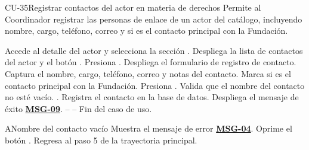 \begin{UseCase}{CU-35}{Registrar contactos del actor en materia de derechos}{
	Permite al Coordinador registrar las personas de enlace de un actor del catálogo, incluyendo nombre, cargo, teléfono, correo y si es el contacto principal con la Fundación.
}
\end{UseCase}

\begin{UCtrayectoria}
	\UCpaso[\UCactor] Accede al detalle del actor y selecciona la sección .
	\UCpaso Despliega la lista de contactos del actor y el botón .
	\UCpaso[\UCactor] Presiona .
	\UCpaso Despliega el formulario de registro de contacto.
	\UCpaso[\UCactor] Captura el nombre, cargo, teléfono, correo y notas del contacto.
	\UCpaso[\UCactor] Marca si es el contacto principal con la Fundación.
	\UCpaso[\UCactor] Presiona .
	\UCpaso Valida que el nombre del contacto no esté vacío. .
	\UCpaso Registra el contacto en la base de datos.
	\UCpaso Despliega el mensaje de éxito \hyperlink{mMSG09}{\bf MSG-09}.
	\UCpaso[] -- -- Fin del caso de uso.
\end{UCtrayectoria}

\begin{UCtrayectoriaA}{A}{Nombre del contacto vacío}
	\UCpaso Muestra el mensaje de error \hyperlink{mMSG04}{\bf MSG-04}.
	\UCpaso[\UCactor] Oprime el botón .
	\UCpaso Regresa al paso 5 de la trayectoria principal.
\end{UCtrayectoriaA}

